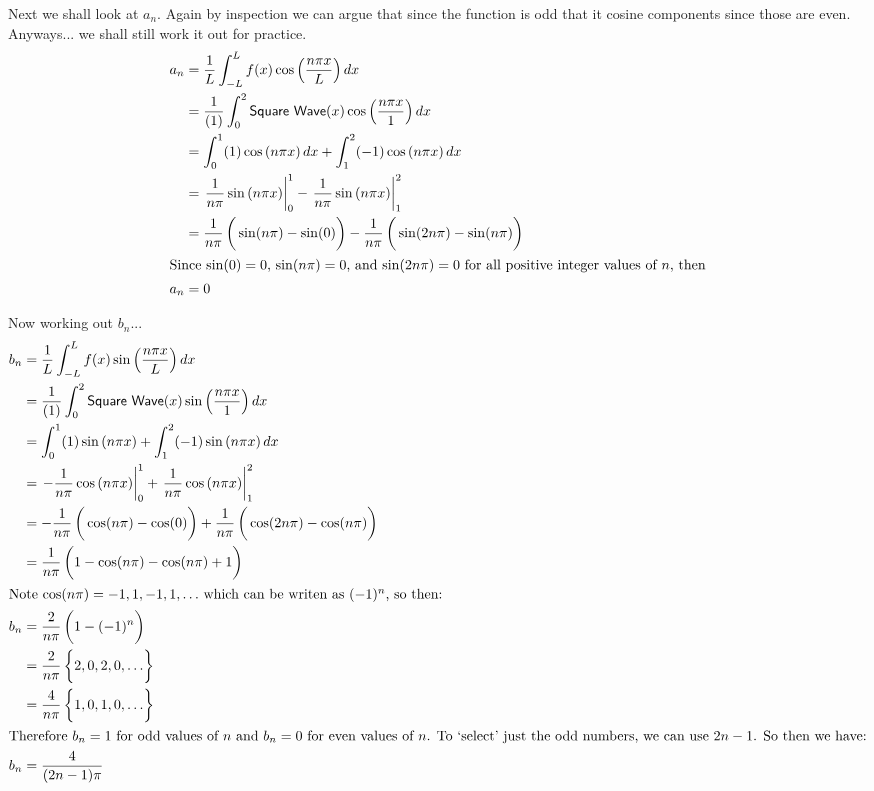 \documentclass[11pt,letterpaper,twoside]{book}
\begin{document}
Next we shall look at $a_n$.  Again by inspection we can argue that since the function is odd that it
cosine components since those are even.  Anyways... we shall still work it out for practice.
\begin{align*}
a_n &= \frac{1}{L}  \int_{-L}^L f(x) \cos \left( \frac{n\pi x}{L} \right) dx \\
    &= \frac{1}{(1)} \int_{0}^{2} \mathsf{Square\ Wave}(x)\cos \left( \frac{n\pi x}{1} \right) dx \\ 
    &= \int_0^1 (1) \cos \left( n\pi x \right) dx + \int_1^2 (-1) \cos \left( n\pi x \right) dx \\
    &= \left. \frac{1}{n \pi} \sin \left( n\pi x \right)\right|^1_0 -  \left. \frac{1}{n \pi} \sin \left( n\pi x \right)\right|^2_1 \\
    &= \frac{1}{n \pi} \left( \vphantom{\frac{1}{2}} \sin ( n\pi) - \sin(0) \right) - \frac{1}{n \pi} \left( \vphantom{\frac{1}{2}} \sin (2n\pi) - \sin(n\pi) \right) \\
\intertext{Since $\sin(0) = 0$, $\sin ( n\pi) = 0$, and $\sin (2n\pi) = 0$ for all positive integer values of $n$, then}
a_n &= 0
\end{align*}

Now working out $b_n$...
\begin{align*}
b_n &= \frac{1}{L} \int_{-L}^L f(x) \sin \left( \frac{n\pi x}{L} \right) dx \\
    &= \frac{1}{(1)} \int_0^2 \mathsf{Square\ Wave}(x) \sin \left( \frac{n\pi x}{1} \right) dx \\
    &= \int_0^1 (1) \sin \left( n\pi x \right) + \int_1^2 (-1) \sin \left( n\pi x \right) dx \\
    &= \left. -\frac{1}{n \pi} \cos \left( n\pi x \right)\right|^1_0 + \left. \frac{1}{n \pi} \cos \left( n\pi x \right)\right|^2_1 \\
    &= -\frac{1}{n \pi} \left( \vphantom{\frac{1}{2}} \cos ( n\pi ) - \cos ( 0 ) \right) + \frac{1}{n \pi} \left( \vphantom{\frac{1}{2}} \cos(2n\pi) - \cos(n\pi) \right) \\ 
    &= \frac{1}{n \pi} \left( \vphantom{\frac{1}{2}} 1 - \cos(n\pi) - \cos(n\pi) + 1\right) \\
\intertext{Note $\cos(n\pi) = -1, 1, -1, 1, \ldots$\ which can be writen as $(-1)^n$, so then: }
b_n &= \frac{2}{n \pi} \left( \vphantom{\frac{1}{2}} 1 - (-1)^n \right) \\
    &= \frac{2}{n \pi} \left\{ \vphantom{\frac{1}{2}} 2, 0, 2, 0, \ldots \right\} \\
    &= \frac{4}{n \pi} \left\{ \vphantom{\frac{1}{2}} 1, 0, 1, 0, \ldots \right\} \\
\intertext{Therefore $b_n = 1$ for odd values of $n$ and $b_n = 0$ for even values of $n$.  To `select' just the odd numbers, we can use $2n - 1$.  So then we have:} 
b_n &= \frac{4}{(2n - 1)\pi} 
\end{align*}
\end{document}
